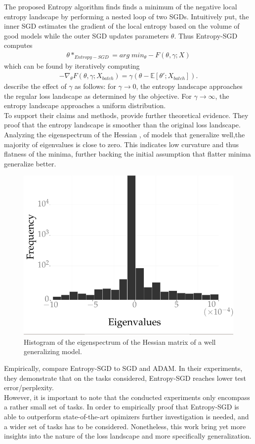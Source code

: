\documentclass[a4paper]{scrartcl}
\begin{document}
The proposed Entropy algorithm finds finds a minimum of the negative local entropy landscape by performing a nested loop of two SGDs. Intuitively put, the inner SGD estimates the gradient of the local entropy based on the volume of good models while the outer SGD updates parameters $\theta$. Thus Entropy-SGD computes
\begin{align*}
	\theta*_{Entropy-SGD} = arg\;min_{\theta} - F(\theta, \gamma; X)
\end{align*}
which can be found by iteratively computing 
\begin{align}
	-\nabla_{\theta}F(\theta, \gamma; X_{batch}) = \gamma (\theta - \mathbb{E}\left[ \theta'; X_{batch} \right]).
\end{align}
\citet{chaudhari2019entropy} describe the effect of $\gamma$ as follows: for $\gamma \rightarrow 0$, the entropy landscape approaches the regular loss landscape as determined by the objective. For $\gamma \rightarrow \infty$, the entropy landscape approaches a uniform distribution.\\
To support their claims and methods, \citet{chaudhari2019entropy} provide further theoretical evidence. They proof that the entropy landscape is smoother than the original loss landscape. Analyzing the eigenspectrum of the Hessian \cite{bishop1992exact}, of models that generalize well,the majority of eigenvalues is close to zero. This indicates low curvature and thus flatness of the minima, further backing the initial assumption that flatter minima generalize better.\\
\begin{figure}[H]
	\centering
	\includegraphics[width=.5\linewidth]{figures/eigenspectrum.png}
	\caption{Histogram of the eigenspectrum of the Hessian matrix of a well generalizing model.}
	\label{fig:eigenspectrum}
\end{figure}
Empirically, \citet{chaudhari2019entropy} compare Entropy-SGD to SGD and ADAM. In their experiments, they demonstrate that on the tasks considered, Entropy-SGD reaches lower test error/perplexity.\\
However, it is important to note that the conducted experiments only encompass a rather small set of tasks. In order to empirically proof that Entropy-SGD is able to outperform state-of-the-art opimizers further investigation is needed, and a wider set of tasks has to be considered. Nonetheless, this work bring yet more insights into the nature of the loss landscape and more specifically generalization.
\end{document}
